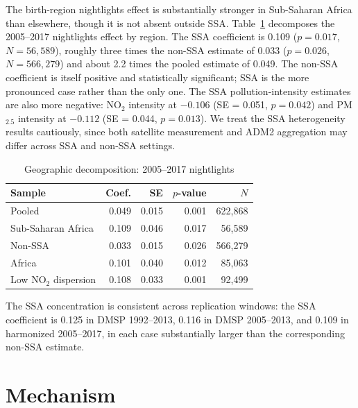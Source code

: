 \documentclass[9pt,twocolumn,twoside]{pnas-new}
\begin{document}
The birth-region nightlights effect is substantially stronger in Sub-Saharan Africa than elsewhere, though it is not absent outside SSA. Table~\ref{tab:ssa-decomp} decomposes the 2005--2017 nightlights effect by region. The SSA coefficient is 0.109 ($p = 0.017$, $N = 56{,}589$), roughly three times the non-SSA estimate of 0.033 ($p = 0.026$, $N = 566{,}279$) and about 2.2 times the pooled estimate of 0.049. The non-SSA coefficient is itself positive and statistically significant; SSA is the more pronounced case rather than the only one. The SSA pollution-intensity estimates are also more negative: NO$_2$ intensity at $-0.106$ (SE = 0.051, $p = 0.042$) and PM$_{2.5}$ intensity at $-0.112$ (SE = 0.044, $p = 0.013$). We treat the SSA heterogeneity results cautiously, since both satellite measurement and ADM2 aggregation may differ across SSA and non-SSA settings.

\begin{table}[t]
\centering
\caption{Geographic decomposition: 2005--2017 nightlights}
\small
\begin{tabular*}{\columnwidth}{@{\extracolsep{\fill}}lrrrr}
Sample & Coef. & SE & $p$-value & $N$ \\
\midrule
Pooled & 0.049 & 0.015 & 0.001 & 622{,}868 \\
Sub-Saharan Africa & 0.109 & 0.046 & 0.017 & 56{,}589 \\
Non-SSA & 0.033 & 0.015 & 0.026 & 566{,}279 \\
Africa & 0.101 & 0.040 & 0.012 & 85{,}063 \\
Low NO$_2$ dispersion & 0.108 & 0.033 & 0.001 & 92{,}499 \\
\bottomrule
\end{tabular*}
\label{tab:ssa-decomp}
\end{table}

The SSA concentration is consistent across replication windows: the SSA coefficient is 0.125 in DMSP 1992--2013, 0.116 in DMSP 2005--2013, and 0.109 in harmonized 2005--2017, in each case substantially larger than the corresponding non-SSA estimate.

\section{Mechanism}
\end{document}
